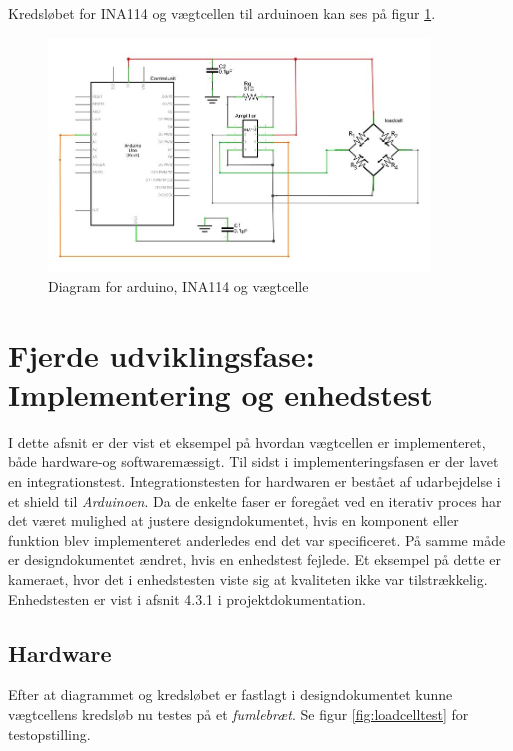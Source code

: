  Kredsløbet for INA114 og vægtcellen til arduinoen kan ses på figur \ref{fig:loadcelldiagram}.
 
  \begin{figure}[H]
	\centering
	\includegraphics[width=0.9\textwidth]{billeder/Hardware/diagrammer/loadcelldiagram.JPG}
	\caption{Diagram for arduino, INA114 og vægtcelle}
	\label{fig:loadcelldiagram}
\end{figure}



\newpage
\section{Fjerde udviklingsfase: Implementering og enhedstest}
\label{subsec:Implement}
I dette afsnit er der vist et eksempel på hvordan vægtcellen er implementeret, både hardware-og softwaremæssigt. Til sidst i implementeringsfasen er der lavet en integrationstest. Integrationstesten for hardwaren er bestået af udarbejdelse i et shield til \textit{Arduinoen}. Da de enkelte faser er foregået ved en iterativ proces har det været mulighed at justere designdokumentet, hvis en komponent eller funktion blev implementeret anderledes end det var specificeret. På samme måde er designdokumentet ændret, hvis en enhedstest fejlede. Et eksempel på dette er kameraet, hvor det i enhedstesten viste sig at kvaliteten ikke var tilstrækkelig. Enhedstesten er vist i afsnit 4.3.1 i projektdokumentation.  

\subsection{Hardware}
Efter at diagrammet og kredsløbet er fastlagt i designdokumentet kunne vægtcellens kredsløb nu testes på et \textit{fumlebræt}. Se figur \ref{fig:loadcelltest} for testopstilling.

